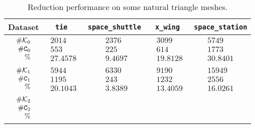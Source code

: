 \documentclass[12pt]{article}
\newcommand{\cK}{{\cal K}}
\newcommand{\sC}{\texttt{C}} \newcommand{\sD}{\texttt{D}} \newcommand{\sM}{\texttt{M}} \newcommand{\sL}{\texttt{L}}
\begin{document}
\begin{table}
\caption{Reduction performance on some natural triangle meshes.}
\begin{tabular}{| c | c | c | c | c |}
\hline
Dataset & \tt{tie} & \tt{space\_shuttle} & \tt{x\_wing} & \tt{space\_station}\\
 \hline
$\begin{array}{rrr}\# \cK_0\\ \# \sC_0\\ \% \end{array} $&
$\begin{array}{rrr}2014\\ 553\\   27.4578
 \end{array}$&
$\begin{array}{rrr}2376\\225\\  9.4697 \end{array}$ &
$\begin{array}{rrr}3099\\614\\ 19.8128 \end{array}$&
$\begin{array}{rrr}5749\\1773\\ 30.8401 \end{array}$ \\
 \hline
 $\begin{array}{rrr}\# \cK_1\\ \# \sC_1\\ \% \end{array}$ &
 $\begin{array}{rrr}5944\\1195\\  20.1043
 \end{array}$&
 $\begin{array}{rrr}6330\\243\\  3.8389 \end{array}$ &
 $\begin{array}{rrr}9190\\1232\\   13.4059 \end{array}$ &
 $\begin{array}{rrr}15949\\2556\\ 16.0261 \end{array}$ \\
 \hline
 $\begin{array}{rrr}\# \cK_2\\ \# \sC_2\\ \% \end{array}$ &

\end{tabular}
\end{table}
\end{document}
